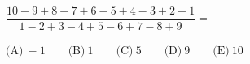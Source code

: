 $\dfrac{10-9+8-7+6-5+4-3+2-1}{1-2+3-4+5-6+7-8+9}=$



$\text{(A)}\ -1 \qquad \text{(B)}\ 1 \qquad \text{(C)}\ 5 \qquad \text{(D)}\ 9 \qquad \text{(E)}\ 10$

